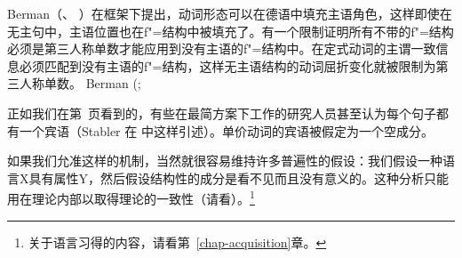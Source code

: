 Berman（\citeyear[]{Berman99a}、
\citeyear[Chapter~4]{Berman2003a}）在\lfg 框架下提出，动词形态可以在德语中填充主语角色，这样即使在无主句中，主语位置也在f"=结构中被填充了。有一个限制证明所有不带\predv 的f"=结构必须是第三人称单数才能应用到没有主语的f"=结构中。在定式动词的主谓一致信息必须匹配到没有主语的f"=结构，这样无主语结构的动词屈折变化就被限制为第三人称单数\citep{Berman99a}。
Berman (\citeyear[]{Berman99a};

正如我们在第~\pageref{Seite-leeres-Objekt}页看到的，有些在最简方案下工作的研究人员甚至认为每个句子都有一个宾语（Stabler 在
\citet[, 124]{Veenstra98a}中这样引述）。单价动词的宾语被假定为一个空成分。
 
 如果我们允准这样的机制，当然就很容易维持许多普遍性的假设：我们假设一种语言X具有属性Y，然后假设结构性的成分是看不见而且没有意义的。这种分析只能用在理论内部以取得理论的一致性（请看\citealp[Section~2.1.2]{CJ2005a}）。\footnote{
 关于语言习得的内容，请看第~\ref{chap-acquisition}章。
 }

